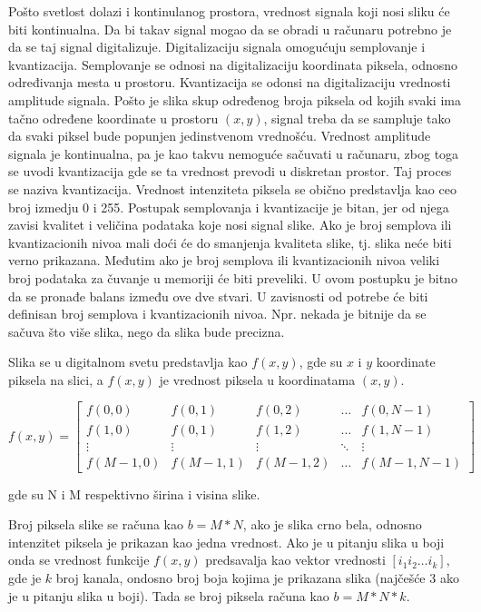 \documentclass[a4paper,12pt,titlepage]{article}
\begin{document}
Pošto svetlost dolazi i kontinulanog prostora, vrednost signala koji nosi sliku će biti kontinualna. Da bi takav signal mogao da se obradi u računaru potrebno je da se taj signal digitalizuje. Digitalizaciju signala omogućuju semplovanje i kvantizacija. Semplovanje se odnosi na digitalizaciju koordinata piksela, odnosno određivanja mesta u prostoru. Kvantizacija se odonsi na digitalizaciju vrednosti amplitude signala. Pošto je slika skup određenog broja piksela od kojih svaki ima tačno određene koordinate u prostoru $(x, y)$, signal treba da se sampluje tako da svaki piksel bude popunjen jedinstvenom vrednošću. Vrednost amplitude signala je kontinualna, pa je kao takvu nemoguće sačuvati u računaru, zbog toga se uvodi kvantizacija gde se ta vrednost prevodi u diskretan prostor. Taj proces se naziva kvantizacija. Vrednost intenziteta piksela se obično predstavlja kao ceo broj izmedju 0 i 255. Postupak semplovanja i kvantizacije je bitan, jer od njega zavisi kvalitet i veličina podataka koje nosi signal slike. Ako je broj semplova ili kvantizacionih nivoa mali doći će do smanjenja kvaliteta slike, tj. slika neće biti verno prikazana. Međutim ako je broj  semplova ili kvantizacionih nivoa veliki broj podataka za čuvanje u memoriji će biti preveliki. U ovom postupku je bitno da se pronađe balans između ove dve stvari. U zavisnosti od potrebe će biti definisan broj semplova i kvantizacionih nivoa. Npr. nekada je bitnije da se sačuva što više slika, nego da slika bude precizna.  

Slika se u digitalnom svetu predstavlja kao $f(x, y)$, gde su $x$ i $y$ koordinate piksela na slici, a $f(x, y)$ je vrednost piksela u koordinatama $(x, y)$. 

\[
f(x, y)
=
\begin{bmatrix}
    f(0, 0) & f(0, 1) & f(0, 2) & \dots  & f(0, N - 1) \\
    f(1, 0) & f(0, 1) & f(1, 2) & \dots  & f(1, N - 1) \\
    \vdots & \vdots & \vdots & \ddots & \vdots \\
    f(M - 1, 0) & f(M - 1, 1) & f(M - 1, 2) & \dots  & f(M - 1, N - 1)
\end{bmatrix}
\]

gde su N i M respektivno širina i visina slike.

Broj piksela slike se računa kao $b = M * N$, ako je slika crno bela, odnosno intenzitet piksela je prikazan kao jedna vrednost. Ako je u pitanju slika u boji onda se vrednost funkcije $f(x, y)$ predsavalja kao vektor vrednosti $[i_{1} i_{2} \dots i_{k}]$, gde je $k$ broj kanala, ondosno broj boja kojima je prikazana slika (najčešće 3 ako je u pitanju slika u boji). Tada se broj piksela računa kao $b = M * N * k$.
\end{document}
